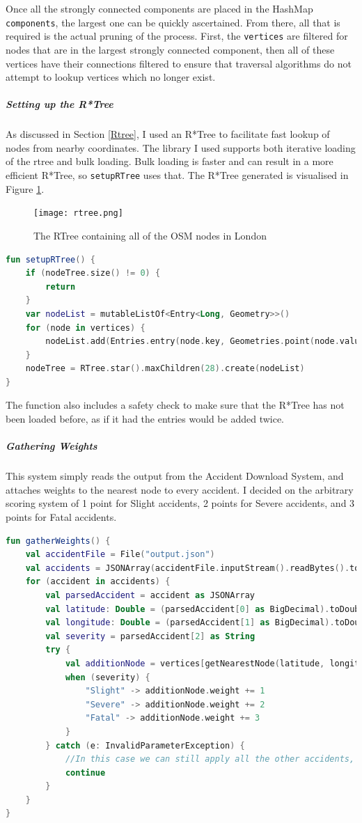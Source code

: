 \documentclass[11pt,twoside,a4paper]{article}
\begin{document}
Once all the strongly connected components are placed in the HashMap \texttt{components}, the largest one can be quickly ascertained. From there, all that is required is the actual pruning of the process.
First, the \texttt{vertices} are filtered for nodes that are in the largest strongly connected component, then all of these vertices have their connections filtered to ensure that traversal algorithms do not attempt to lookup vertices which no longer exist.
\subparagraph{Setting up the R*Tree}
As discussed in Section \ref{Rtree}, I used an R*Tree to facilitate fast lookup of nodes from nearby coordinates. The library I used\cite{rtree} supports both iterative loading of the rtree and bulk loading. Bulk loading is faster and can result in a 
more efficient R*Tree, so \texttt{setupRTree} uses that. The R*Tree generated is visualised in Figure \ref{rvis}.
\begin{figure}[t]
\begin{center}
    \texttt{[image: rtree.png]}
\end{center}
\caption{The RTree containing all of the OSM nodes in London}
\label{rvis}
\end{figure}
\begin{lstlisting}[language=kotlin]
fun setupRTree() {
    if (nodeTree.size() != 0) {
        return
    }
    var nodeList = mutableListOf<Entry<Long, Geometry>>()
    for (node in vertices) {
        nodeList.add(Entries.entry(node.key, Geometries.point(node.value.longitude, node.value.latitude)))
    }
    nodeTree = RTree.star().maxChildren(28).create(nodeList)
}
\end{lstlisting}
The function also includes a safety check to make sure that the R*Tree has not been loaded before, as if it had the entries would be added twice. 
\newpage
\subparagraph{Gathering Weights}
This system simply reads the output from the Accident Download System, and attaches weights to the nearest node to every accident. I decided on the arbitrary scoring system of 1 point for Slight accidents, 2 points for Severe accidents, and 3 points for Fatal accidents. 
\begin{lstlisting}[language=kotlin]
fun gatherWeights() {
    val accidentFile = File("output.json")
    val accidents = JSONArray(accidentFile.inputStream().readBytes().toString(Charsets.UTF_8))
    for (accident in accidents) {
        val parsedAccident = accident as JSONArray
        val latitude: Double = (parsedAccident[0] as BigDecimal).toDouble()
        val longitude: Double = (parsedAccident[1] as BigDecimal).toDouble()
        val severity = parsedAccident[2] as String
        try {
            val additionNode = vertices[getNearestNode(latitude, longitude)]!!
            when (severity) {
                "Slight" -> additionNode.weight += 1
                "Severe" -> additionNode.weight += 2
                "Fatal" -> additionNode.weight += 3
            }
        } catch (e: InvalidParameterException) {
            //In this case we can still apply all the other accidents, even if this accident doesn't match well.
            continue
        }
    }
}
\end{lstlisting}
\end{document}
